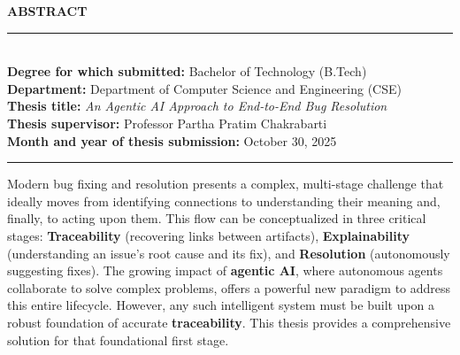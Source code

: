 \documentclass[11pt,english,a4paper]{article}
\begin{document}
	

\newpage
\begin{center}
    {\Large\textbf{ABSTRACT}}\\[0.2in]
\end{center}

\noindent
\rule{\textwidth}{0.4pt}\\[6pt]
\textbf{Degree for which submitted:} Bachelor of Technology (B.Tech)\\
\textbf{Department:} Department of Computer Science and Engineering (CSE)\\
\textbf{Thesis title:} \textit{An Agentic AI Approach to End-to-End Bug Resolution}\\
\textbf{Thesis supervisor:} Professor Partha Pratim Chakrabarti\\
\textbf{Month and year of thesis submission:} October 30, 2025\\[6pt]
\rule{\textwidth}{0.4pt}

\vspace{0.2in}

\noindent
Modern bug fixing and resolution presents a complex, multi-stage challenge that ideally moves from identifying connections to understanding their meaning and, finally, to acting upon them. This flow can be conceptualized in three critical stages: \textbf{Traceability} (recovering links between artifacts), \textbf{Explainability} (understanding an issue's root cause and its fix), and \textbf{Resolution} (autonomously suggesting fixes). The growing impact of \textbf{agentic AI}, where autonomous agents collaborate to solve complex problems, offers a powerful new paradigm to address this entire lifecycle. However, any such intelligent system must be built upon a robust foundation of accurate \textbf{traceability}. This thesis provides a comprehensive solution for that foundational first stage.\\
\end{document}
